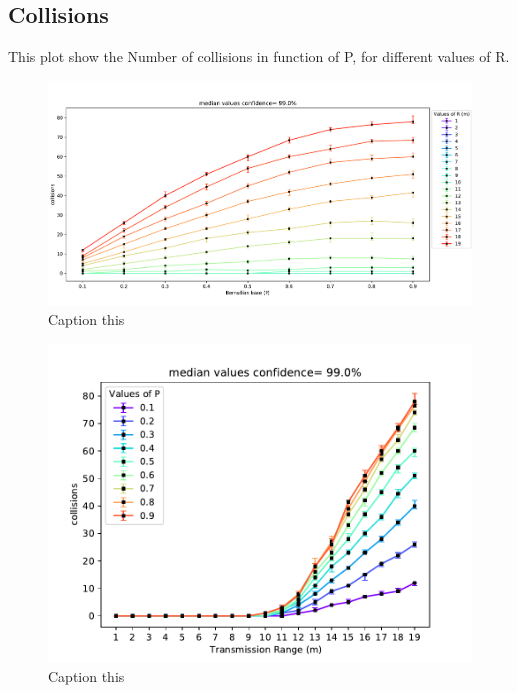 \subsection{Collisions}
This plot show the Number of collisions in function of P, for different values of R.
\begin{figure}[H]
    \begin{center}
        \includegraphics[scale=.4]{img/Big_CollP_median.pdf}
    \end{center}
    \vspace*{-0.5cm}
    \caption{Caption this}
    \label{fig:floorplancoverage5}
\end{figure}
\begin{figure}[H]
    \begin{center}
        \includegraphics[scale=.7]{img/Big_CollRange_median.pdf}
    \end{center}
    \vspace*{-0.5cm}
    \caption{Caption this}
    \label{fig:floorplancoverage6}
\end{figure}
